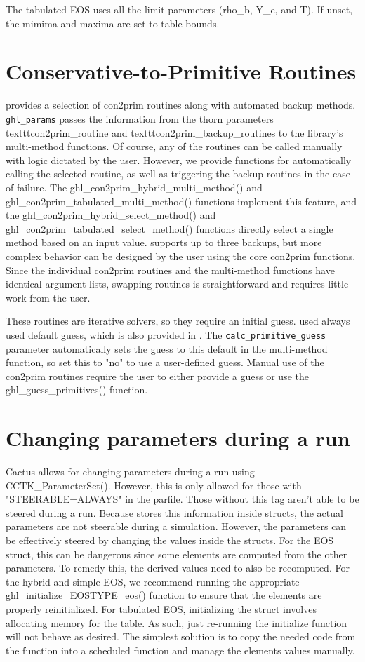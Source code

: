 \documentclass{article}
\begin{document}
The tabulated EOS uses all the limit parameters (rho\_b, Y\_e, and T).
If unset, the mimima and maxima are set to table bounds.

\section{Conservative-to-Primitive Routines}

\grhayl{} provides a selection of con2prim routines along with automated
backup methods. \texttt{ghl\_params} passes the information from the
thorn parameters texttt{con2prim\_routine} and texttt{con2prim\_backup\_routines}
to the library's multi-method functions. Of course, any of the routines
can be called manually with logic dictated by the user. However, we
provide functions for automatically calling the selected routine,
as well as triggering the backup routines in the case of failure.
The ghl\_con2prim\_hybrid\_multi\_method() and
ghl\_con2prim\_tabulated\_multi\_method() functions implement this
feature, and the ghl\_con2prim\_hybrid\_select\_method() and
ghl\_con2prim\_tabulated\_select\_method() functions directly select
a single method based on an input value. \grhayl{} supports up to three
backups, but more complex behavior can be designed by the user using
the core con2prim functions. Since the individual con2prim routines
and the multi-method functions have identical argument lists, swapping
routines is straightforward and requires little work from the user.

These routines are iterative solvers, so they require an initial guess.
\igm{} used always used default guess, which is also provided in \grhayl.
The \texttt{calc\_primitive\_guess} parameter automatically sets the
guess to this default in the multi-method function, so set this to
"no" to use a user-defined guess. Manual use of the con2prim
routines require the user to either provide a guess or use the
ghl\_guess\_primitives() function.

\section{Changing parameters during a run}

Cactus allows for changing parameters during a run using CCTK\_ParameterSet().
However, this is only allowed for those with "STEERABLE=ALWAYS" in the parfile.
Those without this tag aren't able to be steered during a run. Because \glib{}
stores this information inside \grhayl{} structs, the actual parameters are not
steerable during a simulation. However, the parameters can be effectively steered
by changing the values inside the structs. For the EOS struct, this can be
dangerous since some elements are computed from the other parameters. To remedy
this, the derived values need to also be recomputed. For the hybrid and simple EOS,
we recommend running the appropriate ghl\_initialize\_EOSTYPE\_eos() function
to ensure that the elements are properly reinitialized. For tabulated EOS,
initializing the struct involves allocating memory for the table. As such,
just re-running the initialize function will not behave as desired. The simplest
solution is to copy the needed code from the \grhayl{} function into a scheduled
function and manage the elements values manually.

\end{document}
